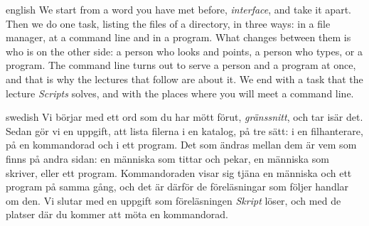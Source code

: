 
\emph{} %
\begin{onlyin}{english} %
We start from a word you have met before, \emph{interface}, and take it
apart.  Then we do one task, listing the files of a directory, in three
ways: in a file manager, at a command line and in a program.  What
changes between them is who is on the other side: a person who looks and
points, a person who types, or a program.  The command line turns out to
serve a person and a program at once, and that is why the lectures that
follow are about it.  We end with a task that the lecture
\emph{Scripts} solves, and with the places where you will meet a
command line.
\end{onlyin}
\begin{onlyin}{swedish}
Vi börjar med ett ord som du har mött förut, \emph{gränssnitt}, och tar
isär det.  Sedan gör vi en uppgift, att lista filerna i en katalog, på
tre sätt: i en filhanterare, på en kommandorad och i ett program.  Det
som ändras mellan dem är vem som finns på andra sidan: en människa som
tittar och pekar, en människa som skriver, eller ett program.
Kommandoraden visar sig tjäna en människa och ett program på samma gång,
och det är därför de föreläsningar som följer handlar om den.  Vi slutar
med en uppgift som föreläsningen \emph{Skript} löser, och med de platser
där du kommer att möta en kommandorad.
\end{onlyin}

